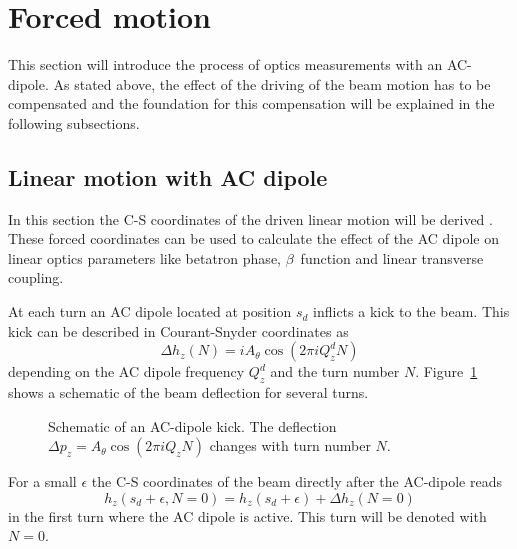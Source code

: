 \section{Forced motion}

This section will introduce the process of optics measurements with an AC-dipole. As stated above,
the effect of the driving of the beam motion has to be compensated and the foundation for this
compensation will be explained in the following subsections.

\subsection{Linear motion with AC dipole}
\newcommand{\Qd}[1]{Q^{d}_{#1}}

In this section the C-S coordinates of the driven linear motion will be derived \cite{Miyamoto2010nPeggs1998}. These forced coordinates
can be used to calculate the effect of the AC dipole on linear optics parameters like betatron phase, 
$\beta$~function and linear transverse coupling.

At each turn an AC dipole located at position $s_d$ inflicts a kick to the beam. This kick can be
described in Courant-Snyder coordinates as
%
\begin{equation}
    \Delta h_z(N) = i A_\theta \cos(2\pi i \Qd{z} N)
\end{equation}
%
depending on the AC dipole frequency $\Qd{z}$ and the turn number $N$. Figure~\ref{fig_ac_kick} shows
a schematic of the beam deflection for several turns.
%
\begin{figure}[h]
    \centering
    
    \caption{
        Schematic of an AC-dipole kick. The deflection $\Delta p_z = A_\theta\cos(2\pi i Q_z N)$
        changes with turn number $N$.}
    \label{fig_ac_kick}
\end{figure}
%
For a small $\epsilon$ the C-S coordinates of the beam directly after the AC-dipole reads
%
\begin{equation}
    h_z(s_d + \epsilon, N=0) = h_z(s_d+\epsilon) + \Delta h_z(N=0)
    \label{eq_ackick}
\end{equation}
%
in the first turn where the AC dipole is active. This turn will be denoted with $N=0$.

